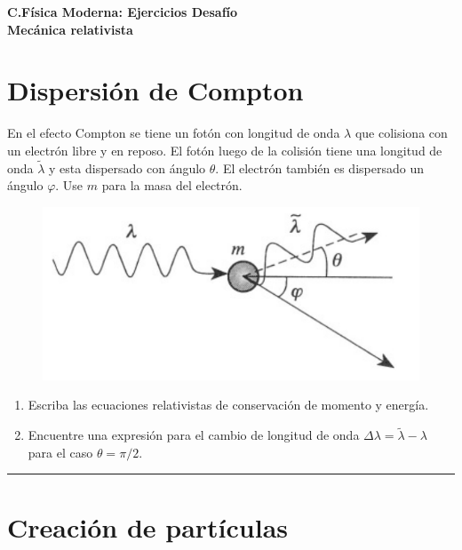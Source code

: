 \documentclass[12pt]{article}
\begin{document}
 
\begin{center}
\Large \textbf{C.Física Moderna: Ejercicios Desafío}\\
\normalsize \textbf{Mecánica relativista}
\end{center}
 
  

\section{Dispersión de Compton}

En el efecto Compton se tiene un fotón con longitud de onda $\lambda$ que colisiona con un electrón libre y en reposo. El fotón luego de la colisión tiene una longitud de onda  $\tilde{\lambda}$ y esta dispersado con ángulo $\theta$. El electrón también es dispersado un ángulo $\varphi$. Use $m$ para la masa del electrón.


\begin{figure}[h]
	\centering
	\includegraphics[width=13cm]{compton}
\end{figure}

\begin{enumerate}
	\item Escriba las ecuaciones relativistas de conservación de momento y energía. 
	\item Encuentre una expresión para el cambio de longitud de onda $\Delta \lambda = \tilde{\lambda} - \lambda$ para el caso $\theta = \pi/2$.
\end{enumerate}



\noindent\rule{16.5cm}{0.4pt}





\section{Creación de partículas}
\end{document}
